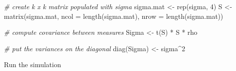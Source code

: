 \documentclass[
]{book}
\newenvironment{Shaded}{\begin{snugshade}}{\end{snugshade}}
\newcommand{\AttributeTok}[1]{\textcolor[rgb]{0.77,0.63,0.00}{#1}}
\newcommand{\CommentTok}[1]{\textcolor[rgb]{0.56,0.35,0.01}{\textit{#1}}}
\newcommand{\DecValTok}[1]{\textcolor[rgb]{0.00,0.00,0.81}{#1}}
\newcommand{\FunctionTok}[1]{\textcolor[rgb]{0.00,0.00,0.00}{#1}}
\newcommand{\NormalTok}[1]{#1}
\newcommand{\OtherTok}[1]{\textcolor[rgb]{0.56,0.35,0.01}{#1}}
\newcommand{\SpecialCharTok}[1]{\textcolor[rgb]{0.00,0.00,0.00}{#1}}
\begin{document}
\begin{Shaded}
\begin{Highlighting}[]
\CommentTok{\# create k x k matrix populated with sigma}
\NormalTok{sigma.mat }\OtherTok{\textless{}{-}} \FunctionTok{rep}\NormalTok{(sigma, }\DecValTok{4}\NormalTok{)}
\NormalTok{S }\OtherTok{\textless{}{-}}
  \FunctionTok{matrix}\NormalTok{(sigma.mat,}
  \AttributeTok{ncol =} \FunctionTok{length}\NormalTok{(sigma.mat),}
  \AttributeTok{nrow =} \FunctionTok{length}\NormalTok{(sigma.mat))}
 
\CommentTok{\# compute covariance between measures}
\NormalTok{Sigma }\OtherTok{\textless{}{-}} \FunctionTok{t}\NormalTok{(S) }\SpecialCharTok{*}\NormalTok{ S }\SpecialCharTok{*}\NormalTok{ rho  }
 
\CommentTok{\# put the variances on the diagonal }
\FunctionTok{diag}\NormalTok{(Sigma) }\OtherTok{\textless{}{-}}\NormalTok{ sigma}\SpecialCharTok{\^{}}\DecValTok{2}  
\end{Highlighting}
\end{Shaded}

Run the simulation
\end{document}
